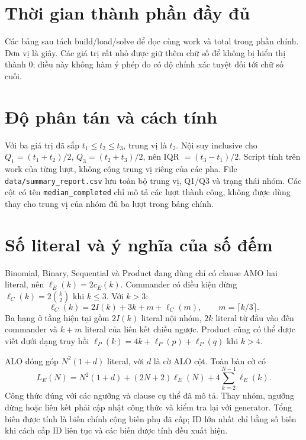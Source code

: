 \FloatBarrier
\appendix
\section{Thời gian thành phần đầy đủ}
\label{app:phases}
Các bảng sau tách build/load/solve để đọc cùng work và total trong phần chính. Đơn vị là giây. Các giá trị rất nhỏ được giữ thêm chữ số để không bị hiển thị thành 0; điều này không hàm ý phép đo có độ chính xác tuyệt đối tới chữ số cuối.





\FloatBarrier
\section{Độ phân tán và cách tính}
\label{app:dispersion}

Với ba giá trị đã sắp $t_1\le t_2\le t_3$, trung vị là $t_2$. Nội suy inclusive cho $Q_1=(t_1+t_2)/2$, $Q_3=(t_2+t_3)/2$, nên IQR $=(t_3-t_1)/2$. Script tính trên work của từng lượt, không cộng trung vị riêng của các pha. File \texttt{data/summary\_report.csv} lưu toàn bộ trung vị, Q1/Q3 và trạng thái nhóm. Các cột có tên \texttt{median\_completed} chỉ mô tả các lượt thành công, không được dùng thay cho trung vị của nhóm đủ ba lượt trong bảng chính.

\section{Số literal và ý nghĩa của số đếm}
Binomial, Binary, Sequential và Product đang dùng chỉ có clause AMO hai literal, nên $\ell_E(k)=2c_E(k)$. Commander có điều kiện dừng $\ell_C(k)=2\binom k2$ khi $k\le3$. Với $k>3$:
\[
\ell_C(k)=2I(k)+3k+m+\ell_C(m),\qquad m=\lceil k/3\rceil.
\]
Ba hạng ở tầng hiện tại gồm $2I(k)$ literal nội nhóm, $2k$ literal từ đầu vào đến commander và $k+m$ literal của liên kết chiều ngược. Product cũng có thể được viết dưới dạng truy hồi $\ell_P(k)=4k+\ell_P(p)+\ell_P(q)$ khi $k>4$.

ALO đóng góp $N^2(1+d)$ literal, với $d$ là cờ ALO cột. Toàn bàn cờ có
\[
L_E(N)=N^2(1+d)+(2N+2)\ell_E(N)+4\sum_{k=2}^{N-1}\ell_E(k).
\]
Công thức đúng với các ngưỡng và clause cụ thể đã mô tả. Thay nhóm, ngưỡng dừng hoặc liên kết phải cập nhật công thức và kiểm tra lại với generator. Tổng biến được tính là biến chính cộng biến phụ đã cấp; ID lớn nhất chỉ bằng số biến khi cách cấp ID liên tục và các biến được tính đều xuất hiện.

